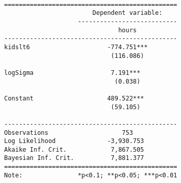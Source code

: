 \documentclass[
  letterpaper,
  DIV=11,
  numbers=noendperiod]{scrreprt}
\begin{document}
\begin{verbatim}

===============================================
                        Dependent variable:    
                    ---------------------------
                               hours           
-----------------------------------------------
kidslt6                     -774.751***        
                             (116.086)         
                                               
logSigma                     7.191***          
                              (0.038)          
                                               
Constant                    489.522***         
                             (59.105)          
                                               
-----------------------------------------------
Observations                    753            
Log Likelihood              -3,930.753         
Akaike Inf. Crit.            7,867.505         
Bayesian Inf. Crit.          7,881.377         
===============================================
Note:               *p<0.1; **p<0.05; ***p<0.01
\end{verbatim}
\end{document}
